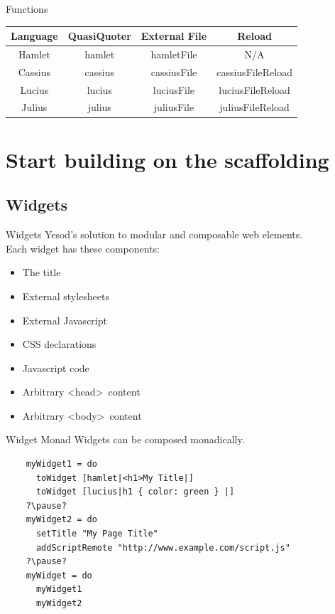 \documentclass[pdf]{beamer}
\begin{document}
\begin{frame}{Functions}
  \begin{center}
    \begin{tabular}{ |c|c|c|c| }
      \hline
      Language & QuasiQuoter & External File & Reload\\
      \hline
      Hamlet & hamlet & hamletFile & N/A\\
      \hline
      Cassius & cassius & cassiusFile & cassiusFileReload\\
      \hline
      Lucius & lucius & luciusFile & luciusFileReload\\
      \hline
      Julius & julius & juliusFile & juliusFileReload\\
      \hline
    \end{tabular}
  \end{center}
\end{frame}

\section{Start building on the scaffolding}

\subsection{Widgets}
\begin{frame}{Widgets}
  Yesod's solution to modular and composable web elements. \\
  Each widget has these components:\\
  \begin{itemize}
  \item<1-> The title
  \item<2-> External stylesheets
  \item<2-> External Javascript
  \item<3-> CSS declarations
  \item<3-> Javascript code
  \item<4-> Arbitrary \textless head\textgreater\ content
  \item<4-> Arbitrary \textless body\textgreater\ content
  \end{itemize}
\end{frame}

\begin{frame}[fragile]{Widget Monad}
  Widgets can be composed monadically.
  \begin{verbatim}
    myWidget1 = do
      toWidget [hamlet|<h1>My Title|]
      toWidget [lucius|h1 { color: green } |]
    ?\pause?
    myWidget2 = do
      setTitle "My Page Title"
      addScriptRemote "http://www.example.com/script.js"
    ?\pause?
    myWidget = do
      myWidget1
      myWidget2
  \end{verbatim}
\end{frame}
\end{document}
